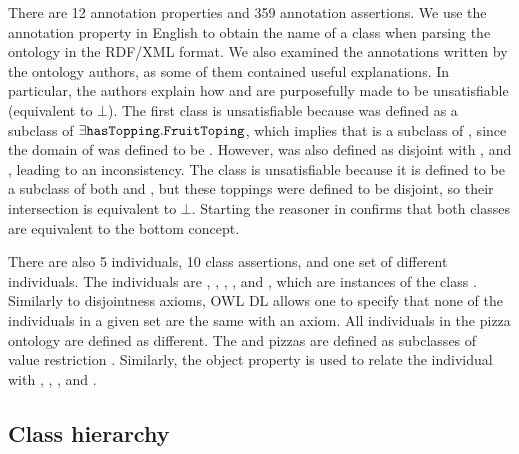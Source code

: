 There are 12 annotation properties and 359 annotation assertions.
We use the  annotation property in English to obtain the name of a class when parsing the ontology in the RDF/XML format.
We also examined the  annotations written by the ontology authors, as some of them contained useful explanations.
In particular, the authors explain how  and  are purposefully made to be unsatisfiable (equivalent to $\bot$).
The first class is unsatisfiable because  was defined as a subclass of $\exists \texttt{hasTopping} .
\texttt{FruitToping}$, which implies that  is a subclass of , since the domain of  was defined to be .
However,  was also defined as disjoint with ,  and , leading to an inconsistency.
The class  is unsatisfiable because it is defined to be a subclass of both  and , but these toppings were defined to be disjoint, so their intersection is equivalent to $\bot$.
Starting the \factpp{} reasoner in \Protege{} confirms that both classes are equivalent to the bottom concept.

There are also 5 individuals, 10 class assertions, and one set of different individuals.
The individuals are , , , , and , which are instances of the class .
Similarly to disjointness axioms, OWL DL allows one to specify that none of the individuals in a given set are the same with an  axiom.
All individuals in the pizza ontology are defined as different.
The  and  pizzas are defined as subclasses of value restriction .
Similarly, the object property  is used to relate the individual  with , , , and .

\subsection{Class hierarchy}


